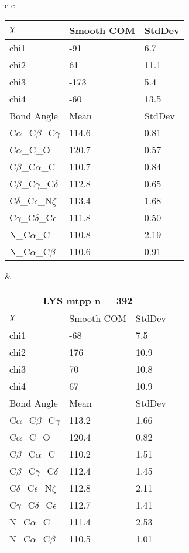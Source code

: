 \begin{longtable}{ c c }
\begin{tabular}{ l l l }
  $\chi$       & Smooth COM & StdDev \\ \midrule
  chi1 & -91 & 6.7 \\ 
  chi2 & 61 & 11.1 \\ 
  chi3 & -173 & 5.4 \\ 
  chi4 & -60 & 13.5 \\ \midrule
  Bond Angle   & Mean     & StdDev \\ \midrule
  C$\alpha$\_C$\beta$\_C$\gamma$ & 114.6 & 0.81\\
  C$\alpha$\_C\_O & 120.7 & 0.57\\
  C$\beta$\_C$\alpha$\_C & 110.7 & 0.84\\
  C$\beta$\_C$\gamma$\_C$\delta$ & 112.8 & 0.65\\
  C$\delta$\_C$\epsilon$\_N$\zeta$ & 113.4 & 1.68\\
  C$\gamma$\_C$\delta$\_C$\epsilon$ & 111.8 & 0.50\\
  N\_C$\alpha$\_C & 110.8 & 2.19\\
  N\_C$\alpha$\_C$\beta$ & 110.6 & 0.91\\
  \bottomrule
  \end{tabular}
  &
  \begin{tabular}{ l l l }
  \toprule
  \multicolumn{3}{c}{LYS \textbf{mtpp} n = 392} \\ \toprule
  $\chi$       & Smooth COM & StdDev \\ \midrule
  chi1 & -68 & 7.5 \\ 
  chi2 & 176 & 10.9 \\ 
  chi3 & 70 & 10.8 \\ 
  chi4 & 67 & 10.9 \\ \midrule
  Bond Angle   & Mean     & StdDev \\ \midrule
  C$\alpha$\_C$\beta$\_C$\gamma$ & 113.2 & 1.66\\
  C$\alpha$\_C\_O & 120.4 & 0.82\\
  C$\beta$\_C$\alpha$\_C & 110.2 & 1.51\\
  C$\beta$\_C$\gamma$\_C$\delta$ & 112.4 & 1.45\\
  C$\delta$\_C$\epsilon$\_N$\zeta$ & 112.8 & 2.11\\
  C$\gamma$\_C$\delta$\_C$\epsilon$ & 112.7 & 1.41\\
  N\_C$\alpha$\_C & 111.4 & 2.53\\
  N\_C$\alpha$\_C$\beta$ & 110.5 & 1.01\\
  \bottomrule
  \end{tabular}
  \\

\end{longtable}
